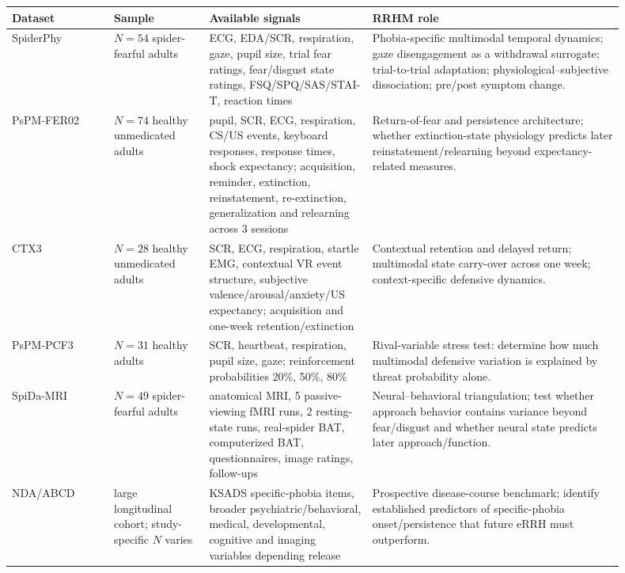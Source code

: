 \documentclass[11pt]{article}
\begin{document}
\begin{longtable}{p{0.15\linewidth}p{0.14\linewidth}p{0.24\linewidth}p{0.37\linewidth}}
\toprule
Dataset & Sample & Available signals & RRHM role \\
\midrule
SpiderPhy & $N=54$ spider-fearful adults & ECG, EDA/SCR, respiration, gaze, pupil size, trial fear ratings, fear/disgust state ratings, FSQ/SPQ/SAS/STAI-T, reaction times & Phobia-specific multimodal temporal dynamics; gaze disengagement as a withdrawal surrogate; trial-to-trial adaptation; physiological--subjective dissociation; pre/post symptom change. \\
PsPM-FER02 & $N=74$ healthy unmedicated adults & pupil, SCR, ECG, respiration, CS/US events, keyboard responses, response times, shock expectancy; acquisition, reminder, extinction, reinstatement, re-extinction, generalization and relearning across 3 sessions & Return-of-fear and persistence architecture; whether extinction-state physiology predicts later reinstatement/relearning beyond expectancy-related measures. \\
CTX3 & $N=28$ healthy unmedicated adults & SCR, ECG, respiration, startle EMG, contextual VR event structure, subjective valence/arousal/anxiety/US expectancy; acquisition and one-week retention/extinction & Contextual retention and delayed return; multimodal state carry-over across one week; context-specific defensive dynamics. \\
PsPM-PCF3 & $N=31$ healthy adults & SCR, heartbeat, respiration, pupil size, gaze; reinforcement probabilities 20\%, 50\%, 80\% & Rival-variable stress test: determine how much multimodal defensive variation is explained by threat probability alone. \\
SpiDa-MRI & $N=49$ spider-fearful adults & anatomical MRI, 5 passive-viewing fMRI runs, 2 resting-state runs, real-spider BAT, computerized BAT, questionnaires, image ratings, follow-ups & Neural--behavioral triangulation; test whether approach behavior contains variance beyond fear/disgust and whether neural state predicts later approach/function. \\
NDA/ABCD & large longitudinal cohort; study-specific $N$ varies & KSADS specific-phobia items, broader psychiatric/behavioral, medical, developmental, cognitive and imaging variables depending release & Prospective disease-course benchmark; identify established predictors of specific-phobia onset/persistence that future eRRH must outperform. \\
\bottomrule
\end{longtable}
\end{document}
